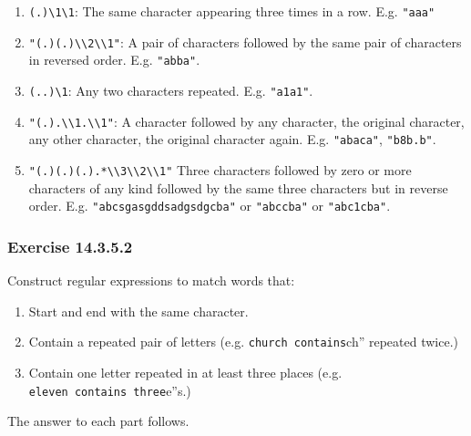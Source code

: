 \documentclass[]{book}
\providecommand{\tightlist}{%
  \setlength{\itemsep}{0pt}\setlength{\parskip}{0pt}}
\theoremstyle{plain}
\theoremstyle{remark}
\begin{document}
\begin{enumerate}
\def\labelenumi{\arabic{enumi}.}
\tightlist
\item
  \texttt{(.)\textbackslash{}1\textbackslash{}1}: The same character
  appearing three times in a row. E.g. \texttt{"aaa"}
\item
  \texttt{"(.)(.)\textbackslash{}\textbackslash{}2\textbackslash{}\textbackslash{}1"}:
  A pair of characters followed by the same pair of characters in
  reversed order. E.g. \texttt{"abba"}.
\item
  \texttt{(..)\textbackslash{}1}: Any two characters repeated. E.g.
  \texttt{"a1a1"}.
\item
  \texttt{"(.).\textbackslash{}\textbackslash{}1.\textbackslash{}\textbackslash{}1"}:
  A character followed by any character, the original character, any
  other character, the original character again. E.g. \texttt{"abaca"},
  \texttt{"b8b.b"}.
\item
  \texttt{"(.)(.)(.).*\textbackslash{}\textbackslash{}3\textbackslash{}\textbackslash{}2\textbackslash{}\textbackslash{}1"}
  Three characters followed by zero or more characters of any kind
  followed by the same three characters but in reverse order. E.g.
  \texttt{"abcsgasgddsadgsdgcba"} or \texttt{"abccba"} or
  \texttt{"abc1cba"}.
\end{enumerate}

\hypertarget{exercise-14.3.5.2}{%
\subsubsection*{\texorpdfstring{Exercise
{14.3.5.2}}{Exercise 14.3.5.2}}\label{exercise-14.3.5.2}}

Construct regular expressions to match words that:

\begin{enumerate}
\def\labelenumi{\arabic{enumi}.}
\tightlist
\item
  Start and end with the same character.
\item
  Contain a repeated pair of letters (e.g.
  \texttt{church\textquotesingle{}\textquotesingle{}\ contains}ch''
  repeated twice.)
\item
  Contain one letter repeated in at least three places (e.g.
  \texttt{eleven\textquotesingle{}\textquotesingle{}\ contains\ three}e''s.)
\end{enumerate}

The answer to each part follows.
\end{document}
